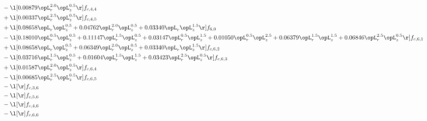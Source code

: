 \begin{alignat}{2}
& - \l[  0.00879 \opL_r^{2.0} \opL_z^{0.5}  \r] f_{c,4,4} \nonumber \\ 
& + \l[  0.00337 \opL_r^{2.5} \opL_z^{0.5}  \r] f_{c,4,5} \nonumber \\ 
& + \l[  0.08658 \opL_r \opL_z^{0.5} +  0.04762 \opL_r^{2.0} \opL_z^{0.5} +  0.03340 \opL_r \opL_z^{1.5}  \r] f_{6,0} \nonumber \\ 
& - \l[  0.18010 \opL_r^{0.5} \opL_z^{0.5} +  0.11147 \opL_r^{1.5} \opL_z^{0.5} +  0.03147 \opL_r^{0.5} \opL_z^{1.5} +  0.01050 \opL_r^{0.5} \opL_z^{2.5} +  0.06379 \opL_r^{1.5} \opL_z^{1.5} +  0.06846 \opL_r^{2.5} \opL_z^{0.5}  \r] f_{c,6,1} \nonumber \\ 
& + \l[  0.08658 \opL_r \opL_z^{0.5} +  0.06349 \opL_r^{2.0} \opL_z^{0.5} +  0.03340 \opL_r \opL_z^{1.5}  \r] f_{c,6,2} \nonumber \\ 
& - \l[  0.03716 \opL_r^{1.5} \opL_z^{0.5} +  0.01604 \opL_r^{1.5} \opL_z^{1.5} +  0.03423 \opL_r^{2.5} \opL_z^{0.5}  \r] f_{c,6,3} \nonumber \\ 
& + \l[  0.01587 \opL_r^{2.0} \opL_z^{0.5}  \r] f_{c,6,4} \nonumber \\ 
& - \l[  0.00685 \opL_r^{2.5} \opL_z^{0.5}  \r] f_{c,6,5} \nonumber \\ 
& - \l[  \r] f_{c,3,6} \nonumber \\ 
& - \l[  \r] f_{c,5,6} \nonumber \\ 
& - \l[  \r] f_{c,4,6} \nonumber \\ 
& - \l[  \r] f_{c,6,6} \nonumber \\ 
\end{alignat} 


